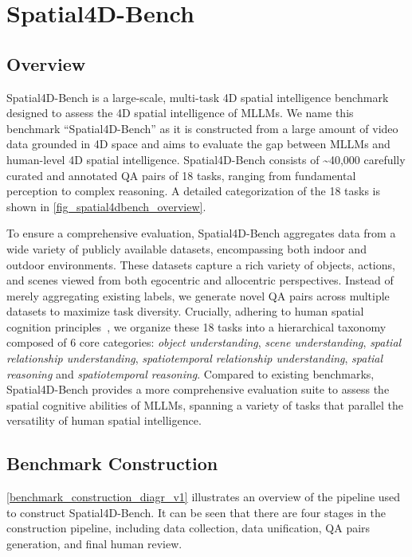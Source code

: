 \section{Spatial4D-Bench}
\label{sibench}


\subsection{Overview}
\label{sibench_overview}
Spatial4D-Bench is a large-scale, multi-task 4D spatial intelligence benchmark designed to assess the 4D spatial intelligence of MLLMs.
We name this benchmark ``Spatial4D-Bench'' as it is constructed from a large amount of video data grounded in 4D space and aims to evaluate the gap between MLLMs and human-level 4D spatial intelligence.
Spatial4D-Bench consists of \textasciitilde40,000 carefully curated and annotated QA pairs of 18 tasks, ranging from fundamental perception to complex reasoning. A detailed categorization of the 18 tasks is shown in \cref{fig_spatial4dbench_overview}.%

To ensure a comprehensive evaluation, Spatial4D-Bench aggregates data from a wide variety of publicly available datasets, encompassing both indoor and outdoor environments.
These datasets capture a rich variety of objects, actions, and scenes viewed from both egocentric and allocentric perspectives.
Instead of merely aggregating existing labels, we generate novel QA pairs across multiple datasets to maximize task diversity. 
Crucially, adhering to human spatial cognition principles~\cite{waller2013handbook, newcombe2004spatial}, we organize these 18 tasks into a hierarchical taxonomy composed of 6 core categories: \textit{object understanding}, \textit{scene understanding}, \textit{spatial relationship understanding}, \textit{spatiotemporal relationship understanding}, \textit{spatial
reasoning} and \textit{spatiotemporal reasoning}.
Compared to existing benchmarks, Spatial4D-Bench provides a more comprehensive evaluation suite to assess the spatial cognitive abilities of MLLMs, spanning a variety of tasks that parallel the versatility of human spatial intelligence. 





\subsection{Benchmark Construction}
\label{subsec:construction}

\cref{benchmark_construction_diagr_v1} illustrates an overview of the pipeline used to construct Spatial4D-Bench.
It can be seen that there are four stages in the construction pipeline, including data collection, data unification, QA pairs generation, and final human review.



